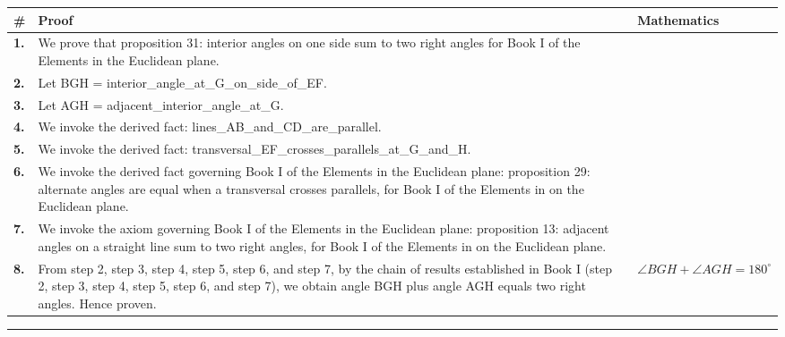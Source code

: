 \documentclass[11pt]{article}
\theoremstyle{definition}
\begin{document}
\begin{tabular}{@{} >{\raggedright\arraybackslash}p{} >{\raggedright\arraybackslash}p{} >{\raggedleft\arraybackslash}p{} @{}}
\textbf{\#} & \textbf{Proof} & \textbf{Mathematics} \\
\midrule
\textbf{1.} & We prove that proposition 31: interior angles on one side sum to two right angles for Book I of the Elements in the Euclidean plane. & \\[0.45em]
\textbf{2.} & Let BGH = interior\_angle\_at\_G\_on\_side\_of\_EF. & \\[0.45em]
\textbf{3.} & Let AGH = adjacent\_interior\_angle\_at\_G. & \\[0.45em]
\textbf{4.} & We invoke the derived fact: lines\_AB\_and\_CD\_are\_parallel. & \\[0.45em]
\textbf{5.} & We invoke the derived fact: transversal\_EF\_crosses\_parallels\_at\_G\_and\_H. & \\[0.45em]
\textbf{6.} & We invoke the derived fact governing Book I of the Elements in the Euclidean plane: proposition 29: alternate angles are equal when a transversal crosses parallels, for Book I of the Elements in on the Euclidean plane. & \\[0.45em]
\textbf{7.} & We invoke the axiom governing Book I of the Elements in the Euclidean plane: proposition 13: adjacent angles on a straight line sum to two right angles, for Book I of the Elements in on the Euclidean plane. & \\[0.45em]
\textbf{8.} & From step 2, step 3, step 4, step 5, step 6, and step 7, by the chain of results established in Book I (step 2, step 3, step 4, step 5, step 6, and step 7), we obtain angle BGH plus angle AGH equals two right angles. Hence proven. & $\displaystyle \angle BGH + \angle AGH = 180^\circ$ \\[0.45em]
\bottomrule
\end{tabular}
\label{thm:Geometry-Euclid Book I-proposition_31_interior_angles_on_one_side_sum_to_two_right_angles}
\par\medskip\hrule
\end{document}
